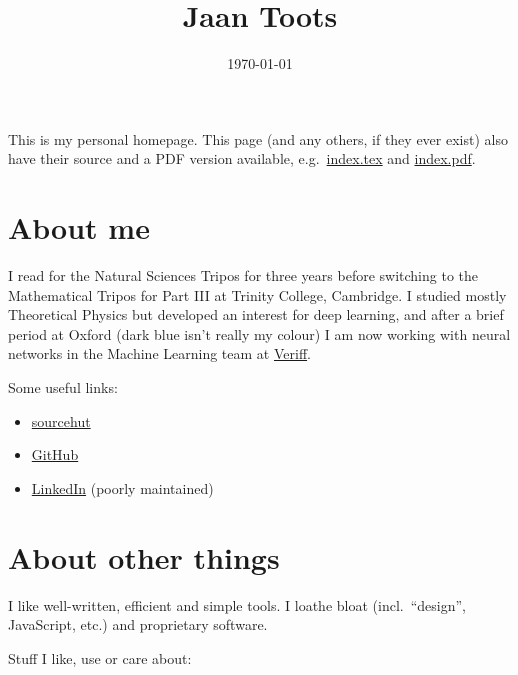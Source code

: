 \documentclass{article}
\title{Jaan Toots}
\author{jaan [at] jaan.xyz%
\footnote{\href%
{898F754DC9C848CDAC4D33029AE22DC9DF6496F6.asc}%
{\texttt{898F754DC9C848CDAC4D33029AE22DC9DF6496F6}}%
}}
\date{\today}
\begin{document}
\maketitle

This is my personal homepage. This page (and any others, if they ever exist)
also have their source and a PDF version available, e.g.\ \url{index.tex} and
\url{index.pdf}.

\section{About me}

I read for the Natural Sciences Tripos for three years before switching to the
Mathematical Tripos for Part III at Trinity College, Cambridge. I studied
mostly Theoretical Physics but developed an interest for deep learning, and
after a brief period at Oxford (dark blue isn't really my colour) I am now
working with neural networks in the Machine Learning team at
\href{https://veriff.me/}{Veriff}.

Some useful links:

\begin{itemize}
  \item \href{https://git.sr.ht/~jaan/}{sourcehut}
  \item \href{https://github.com/jaantoots}{GitHub}
  \item \href{https://www.linkedin.com/in/jaantoots/}{LinkedIn} (poorly
    maintained)
\end{itemize}

\section{About other things}

I like well-written, efficient and simple tools. I loathe bloat (incl.\
``design'', JavaScript, etc.) and proprietary software.

Stuff I like, use or care about:

\end{document}
